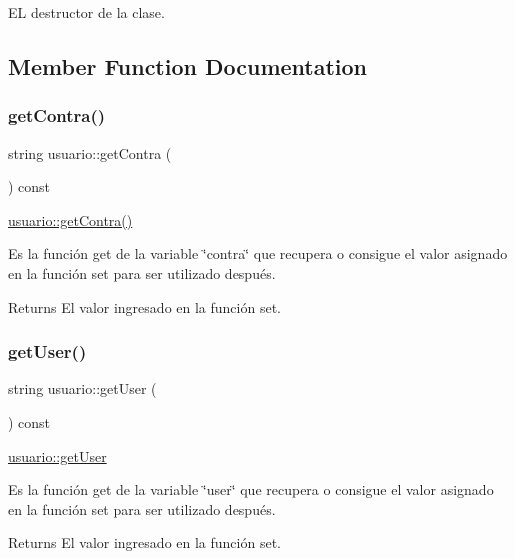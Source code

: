 EL destructor de la clase. 

\subsection{Member Function Documentation}
\mbox{\label{classusuario_ae8abb797a4efda6053b2c15936ba9792}} 
\subsubsection{\texorpdfstring{get\+Contra()}{getContra()}}
{\footnotesize\ttfamily string usuario\+::get\+Contra (\begin{DoxyParamCaption}{ }\end{DoxyParamCaption}) const}



\hyperlink{classusuario_ae8abb797a4efda6053b2c15936ba9792}{usuario\+::get\+Contra()} 

Es la función get de la variable \char`\"{}contra\char`\"{} que recupera o consigue el valor asignado en la función set para ser utilizado después. \begin{DoxyReturn}{Returns}
El valor ingresado en la función set. 
\end{DoxyReturn}
\mbox{\label{classusuario_a0a32493a53b4aed9d66662f8e6839889}} 
\subsubsection{\texorpdfstring{get\+User()}{getUser()}}
{\footnotesize\ttfamily string usuario\+::get\+User (\begin{DoxyParamCaption}{ }\end{DoxyParamCaption}) const}



\hyperlink{classusuario_a0a32493a53b4aed9d66662f8e6839889}{usuario\+::get\+User} 

Es la función get de la variable \char`\"{}user\char`\"{} que recupera o consigue el valor asignado en la función set para ser utilizado después. \begin{DoxyReturn}{Returns}
El valor ingresado en la función set. 
\end{DoxyReturn}
\mbox{\label{classusuario_a8e027d694579ff05152cc77c50886111}} 
